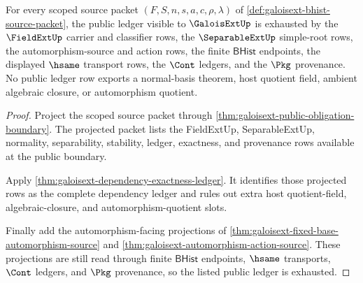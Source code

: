 \begin{theorem}
\label{thm:galoisext-public-ledger-coverage}
For every scoped source packet $(F,S,n,s,a,c,\rho,\lambda)$ of
\autoref{def:galoisext-bhist-source-packet}, the public ledger visible to
$\GaloisExtUp$ is exhausted by the $\FieldExtUp$ carrier and classifier rows,
the $\SeparableExtUp$ simple-root rows, the automorphism-source and action
rows, the finite $\mathsf{BHist}$ endpoints, the displayed $\hsame$ transport
rows, the $\Cont$ ledgers, and the $\Pkg$ provenance. No public ledger row
exports a normal-basis theorem, host quotient field, ambient algebraic closure,
or automorphism quotient.
\end{theorem}
\begin{proof}
Project the scoped source packet through
\autoref{thm:galoisext-public-obligation-boundary}. The projected packet lists
the FieldExtUp, SeparableExtUp, normality, separability, stability, ledger,
exactness, and provenance rows available at the public boundary.

Apply \autoref{thm:galoisext-dependency-exactness-ledger}. It identifies those
projected rows as the complete dependency ledger and rules out extra host
quotient-field, algebraic-closure, and automorphism-quotient slots.

Finally add the automorphism-facing projections of
\autoref{thm:galoisext-fixed-base-automorphism-source} and
\autoref{thm:galoisext-automorphism-action-source}. These projections are still
read through finite $\mathsf{BHist}$ endpoints, $\hsame$ transports, $\Cont$
ledgers, and $\Pkg$ provenance, so the listed public ledger is exhausted.
\end{proof}

